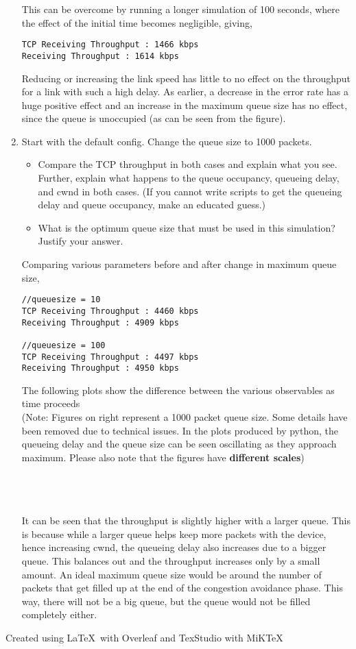 \documentclass[a4paper]{article}
\begin{document}
\begin{enumerate}
This can be overcome by running a longer simulation of 100 seconds, where the effect of the initial time becomes negligible, giving,
\begin{verbatim}
TCP Receiving Throughput : 1466 kbps
Receiving Throughput : 1614 kbps
\end{verbatim}

Reducing or increasing the link speed has little to no effect on the throughput for a link with such a high delay. As earlier, a decrease in the error rate has a huge positive effect and an increase in the maximum queue size has no effect, since the queue is unoccupied (as can be seen from the figure).

\item Start with the default config. Change the queue size to 1000 packets.
\begin{itemize}
	\item Compare the TCP throughput in both cases and explain what you see. Further, explain what happens to the queue occupancy, queueing delay, and cwnd in both cases. (If you cannot write scripts to get the queueing delay and queue occupancy, make an educated guess.) 
	\item What is the optimum queue size that must be used in this simulation? Justify your answer. 
\end{itemize}

Comparing various parameters before and after change in maximum queue size,
\begin{verbatim}
//queuesize = 10
TCP Receiving Throughput : 4460 kbps
Receiving Throughput : 4909 kbps

//queuesize = 100
TCP Receiving Throughput : 4497 kbps
Receiving Throughput : 4950 kbps
\end{verbatim}

The following plots show the difference between the various observables as time proceeds\\
(Note: Figures on right represent a 1000 packet queue size. Some details have been removed due to technical issues. In the plots produced by python, the queueing delay and the queue size can be seen oscillating as they approach maximum. Please also note that the figures have \textbf{different scales})

\\
\\
\\

It can be seen that the throughput is slightly higher with a larger queue. This is because while a larger queue helps keep more packets with the device, hence increasing cwnd, the queueing delay also increases due to a bigger queue. This balances out and the throughput increases only by a small amount. An ideal maximum queue size would be around the number of packets that get filled up at the end of the congestion avoidance phase. This way, there will not be a big queue, but the queue would not be filled completely either.
\end{enumerate}

  \begin{center}
  Created using \LaTeX \ with Overleaf and TexStudio with MiKTeX
  \end{center}
  
\end{document}
